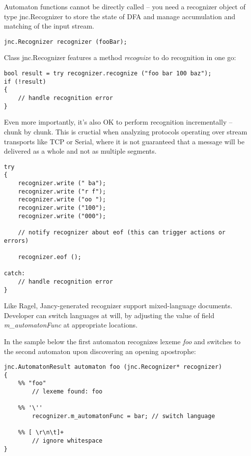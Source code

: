 \documentclass[oneside]{book}
\begin{document}
Automaton functions cannot be directly called -- you need a recognizer object of type jnc.Recognizer to store the state of DFA and manage accumulation and matching of the input stream.

\begin{lstlisting}
jnc.Recognizer recognizer (fooBar);
\end{lstlisting}

Class jnc.Recognizer features a method \emph{recognize} to do recognition in one go:

\begin{lstlisting}
bool result = try recognizer.recognize ("foo bar 100 baz");
if (!result)
{
    // handle recognition error 
}
\end{lstlisting}

Even more importantly, it's also OK to perform recognition incrementally -- chunk by chunk. This is cructial when analyzing protocols operating over stream transports like TCP or Serial, where it is not guaranteed that a message will be delivered as a whole and not as multiple segments.

\begin{lstlisting}
try 
{
    recognizer.write (" ba");
    recognizer.write ("r f");
    recognizer.write ("oo ");
    recognizer.write ("100");
    recognizer.write ("000");

    // notify recognizer about eof (this can trigger actions or errors)

    recognizer.eof (); 

catch: 
    // handle recognition error
}
\end{lstlisting}

Like Ragel, Jancy-generated recognizer support mixed-language documents. Developer can switch languages at will, by adjusting the value of field \emph{m\_automatonFunc} at appropriate locations.

In the sample below the first automaton recognizes lexeme \emph{foo} and switches to the second automaton upon discovering an opening apostrophe:

\begin{lstlisting}
jnc.AutomatonResult automaton foo (jnc.Recognizer* recognizer)
{
    %% "foo"
        // lexeme found: foo

    %% '\''
        recognizer.m_automatonFunc = bar; // switch language

    %% [ \r\n\t]+
        // ignore whitespace
}
\end{lstlisting}
\end{document}

